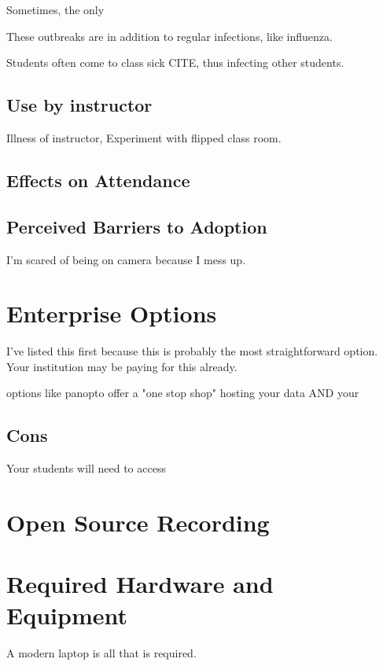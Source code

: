 \documentclass[sigconf]{acmart}
\begin{document}
Sometimes, the only 

These outbreaks are in addition to regular infections, like influenza. 

Students often come to class sick CITE, thus infecting other students.





\subsection{Use by instructor}
Illness of instructor, 
Experiment with flipped class room.


\subsection{Effects on Attendance}




\subsection{Perceived Barriers to Adoption}
I'm scared of being on camera because I mess up.


\section{Enterprise Options}
I've listed this first because this is probably the most straightforward option.
Your institution may be paying for this already.




options like panopto  offer a "one stop shop" hosting your data AND your


\subsection{Cons}
Your students will need to access

\section{Open Source Recording}




\section{Required Hardware and Equipment}
A modern laptop is all that is required.
\end{document}
